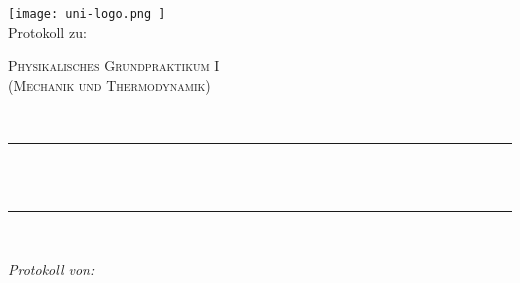 \makeatletter
\let\thetitle\@title
\let\theauthor\@author
\let\thedate\@date
\makeatother

\pagestyle{fancy}
\fancyhf{}

    \begin{titlepage}
        \centering
        \vspace*{0.5 cm}
        \texttt{[image:  uni-logo.png ]} \\ [2.0 cm]

        Protokoll zu: \\
        \begin{center}    
            \textsc{ \Large Physikalisches Grundpraktikum I \\ (Mechanik und Thermodynamik)} \\ [2.0 cm]
        \end{center}

        \textsc{ 
            \Large \thetitle{}
        } \\ [0.5 cm]
        
        \rule{\linewidth}{0.2 mm} \\ [0.4 cm]
        { \huge \bfseries \thetitle} \\
        \rule{\linewidth}{0.2 mm} \\ [1.5 cm]
        
        \begin{minipage}{ 0.4 \textwidth }
            \begin{flushleft} \large
            \end{flushleft}
        \end{minipage}
                
        \begin{minipage}{ 0.4 \textwidth }
            \begin{flushright} \large
                \emph{Protokoll von: } \\
                \theauthor{}
            \end{flushright}
        \end{minipage} \\ [2 cm]
        
    \end{titlepage}